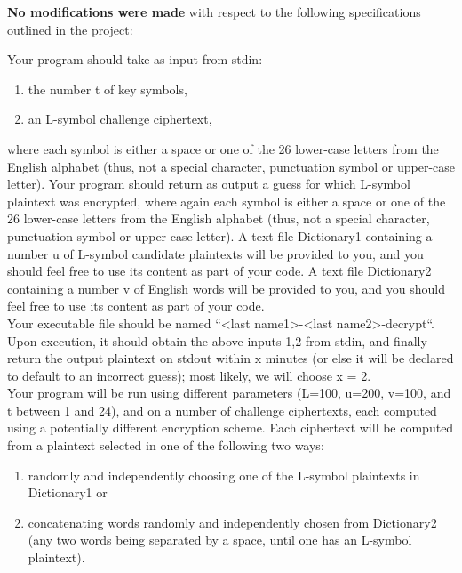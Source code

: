 \documentclass[a4paper,twoside,10pt]{report}
\begin{document}
\vspace{4mm}
\noindent
\textbf{No modifications were made} with respect to the following specifications outlined in the project:

\vspace{5mm}
\noindent
Your program should take as input from stdin:
\begin{enumerate}
	\item the number t of key symbols,
	\item an L-symbol challenge ciphertext,
\end{enumerate}

\noindent
where each symbol is either a space or one of the 26 lower-case letters from the English alphabet (thus, not a special character, punctuation symbol or upper-case letter). Your program should return as output a guess for which L-symbol plaintext was encrypted, where again each symbol is either a space or one of the 26 lower-case letters from the English alphabet (thus, not a special character, punctuation symbol or upper-case letter). A text file Dictionary1 containing a number u of L-symbol candidate plaintexts will be provided to you, and you should feel free to use its content as part of your code. A text file Dictionary2 containing a number v of English words will be provided to you, and you should feel free to use its content as part of your code.\\

\noindent
Your executable file should be named ``<last name1>-<last name2>-decrypt``. Upon execution, it should obtain the above inputs 1,2 from stdin, and finally return the output plaintext on stdout within x minutes (or else it will be declared to default to an incorrect guess); most likely, we will choose x = 2.\\

\noindent
Your program will be run using different parameters (L=100, u=200, v=100, and t between 1 and 24), and on a number of challenge ciphertexts, each computed using a potentially different encryption scheme. Each ciphertext will be computed from a plaintext selected in one of the following two ways:

\begin{enumerate}
	\item randomly and independently choosing one of the L-symbol plaintexts in Dictionary1 or
	\item concatenating words randomly and independently chosen from Dictionary2 (any two words being separated by a space, until one has an L-symbol plaintext).
\end{enumerate}
\end{document}
